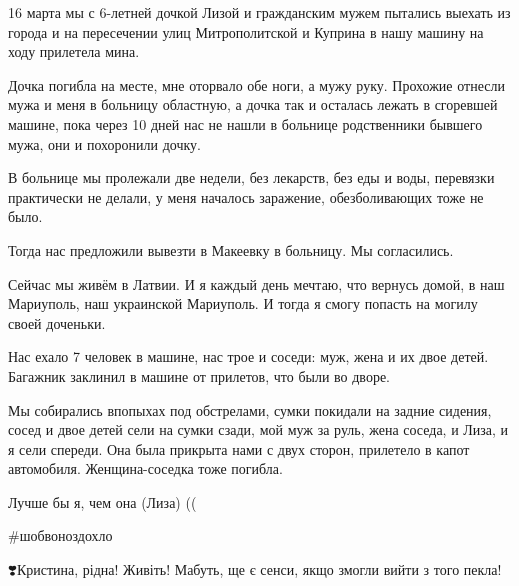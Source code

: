 16 марта мы с 6-летней дочкой Лизой и гражданским мужем пытались выехать из
города и на пересечении улиц Митрополитской и Куприна в нашу машину на ходу
прилетела мина. 

Дочка погибла на месте, мне оторвало обе ноги, а мужу руку. Прохожие отнесли
мужа и меня в больницу областную, а дочка так и осталась лежать в сгоревшей
машине, пока через 10 дней нас не нашли в больнице родственники бывшего мужа,
они и похоронили дочку. 

В больнице мы пролежали две недели, без лекарств, без еды и воды, перевязки
практически не делали, у меня началось заражение, обезболивающих тоже не было. 

Тогда нас предложили вывезти в Макеевку в больницу. Мы согласились. 

Сейчас мы живём в Латвии. И я каждый день мечтаю, что вернусь домой, в наш
Мариуполь, наш украинской Мариуполь. И тогда я смогу попасть на могилу своей
доченьки.

Нас ехало 7 человек в машине, нас трое и соседи: муж, жена и их двое детей.
Багажник заклинил в машине от прилетов, что были во дворе.

Мы собирались впопыхах под обстрелами, сумки покидали на задние сидения, сосед
и двое детей сели на сумки сзади, мой муж за руль, жена соседа, и Лиза, и я
сели спереди. Она была прикрыта нами с двух сторон, прилетело в капот
автомобиля. Женщина-соседка тоже погибла. 

Лучше бы я, чем она (Лиза) ((

\#шобвоноздохло

❣️Кристина, рідна! Живіть! Мабуть, ще є сенси, якщо змогли вийти з того пекла!
